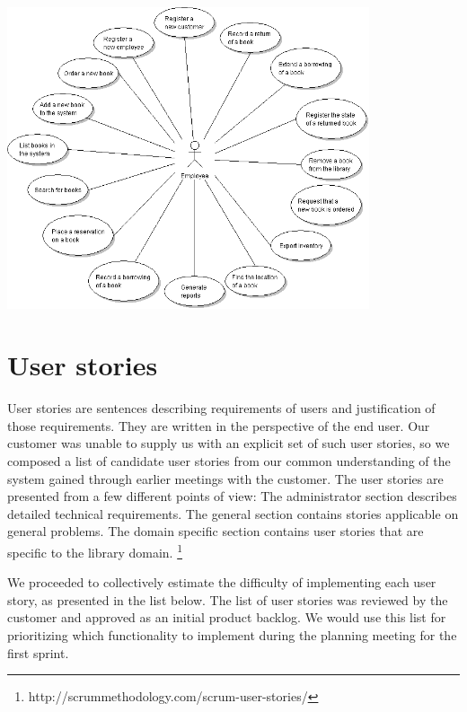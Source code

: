 \begin{center}
\includegraphics[width = 0.8\textwidth]{image/usecase-employee.png}
\label{usecase-employee}%
\end{center}



\section{User stories}
User stories are sentences describing requirements of users and justification of those requirements. They are written in the perspective of the end user. Our customer was unable to supply us with an explicit set of such user stories, so we composed a list of candidate user stories from our common understanding of the system gained through earlier meetings with the customer. The user stories are presented from a few different points of view: The administrator section describes detailed technical requirements. The general section contains stories applicable on general problems. The domain specific section contains user stories that are specific to the library domain. \footnote{http://scrummethodology.com/scrum-user-stories/}

We proceeded to collectively estimate the difficulty of implementing each user story, as presented in the list below. The list of user stories was reviewed by the customer and approved as an initial product backlog. We would use this list for prioritizing which functionality to implement during the planning meeting for the first sprint.

